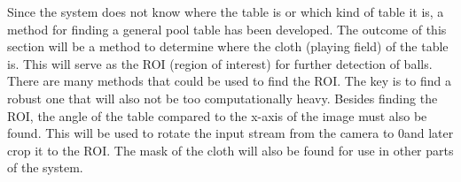 Since the system does not know where the table is or which kind of table it is, a method for finding a general pool table has been developed. The outcome of this section will be a method to determine where the cloth (playing field) of the table is. This will serve as the ROI (region of interest) for further detection of balls. There are many methods that could be used to find the ROI. The key is to find a robust one that will also not be too computationally heavy. Besides finding the ROI, the angle of the table compared to the x-axis of the image must also be found. This will be used to rotate the input stream from the camera to 0\degree and later crop it to the ROI. The mask of the cloth will also be found for use in other parts of the system.\\
